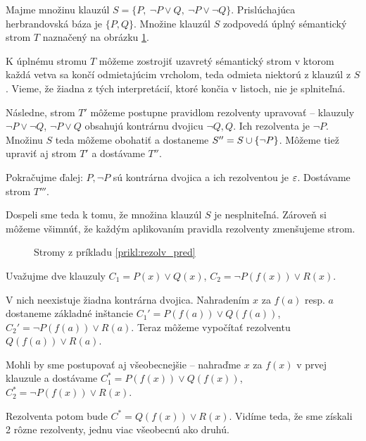 \begin{priklad}
    \label{prikl:rezolv_pred}
    Majme množinu klauzúl 
    $S=\{P,\ \neg P\lor Q,\ \neg P \lor \neg Q\}$.
    Prislúchajúca herbrandovská báza je $\{P, Q\}$.
    Množine klauzúl $S$ zodpovedá úplný sémantický strom $T$
    naznačený na obrázku \ref{fig:rezolv_pred_prikl}. 
    
    K úplnému stromu $T$ môžeme zostrojiť uzavretý sémantický strom v ktorom
    každá vetva sa končí odmietajúcim vrcholom, teda odmieta niektorú
    z klauzúl z $S$.
    Vieme, že žiadna z tých interpretácií, ktoré končia v listoch, 
    nie je splniteľná. 

    Následne, strom $T'$ môžeme postupne pravidlom rezolventy
    upravovať -- klauzuly $\neg P \lor \neg Q$,
    $\neg P \lor Q$ obsahujú kontrárnu dvojicu $\neg Q,Q$.
    Ich rezolventa je $\neg P$. Množinu $S$ teda môžeme obohatiť a
    dostaneme $S''=S \cup \{ \neg P \}$. Môžeme tiež upraviť aj
    strom $T'$ a dostávame $T''$.

    Pokračujme ďalej: $P, \neg P$ sú kontrárna dvojica a ich
    rezolventou je $\varepsilon$. Dostávame strom $T'''$.

    Dospeli sme teda k tomu, že množina klauzúl $S$ je nesplniteľná.
    Zároveň si môžeme všimnúť, že každým aplikovaním pravidla
    rezolventy zmenšujeme strom.
    \begin{figure}
        \centering
        \vskip 1.5cm
        \caption{Stromy z príkladu \ref{prikl:rezolv_pred}}
        \label{fig:rezolv_pred_prikl}
    \end{figure}
\end{priklad}

\begin{priklad}
    Uvažujme dve klauzuly $C_1=P(x) \lor Q(x)$, 
    $C_2 = \neg P(f(x)) \lor R(x)$.

    V nich neexistuje žiadna kontrárna dvojica. Nahradením
    $x$ za $f(a)$ resp. $a$ 
    dostaneme základné inštancie
    $C_1'=P(f(a)) \lor Q(f(a))$, 
    $C_2'=\neg P(f(a)) \lor R(a)$.
    Teraz môžeme vypočítať rezolventu $Q(f(a)) \lor R(a)$.

    Mohli by sme postupovať aj všeobecnejšie -- nahraďme $x$ za $f(x)$ v
    prvej klauzule a dostávame
    $C_1^*= P(f(x)) \lor Q(f(x))$, $C_2^*= \neg P(f(x)) \lor R(x)$.

    Rezolventa potom bude $C^*= Q(f(x)) \lor R(x)$.
    Vidíme teda, že sme získali 2 rôzne rezolventy, jednu viac všeobecnú
    ako druhú.
\end{priklad}


